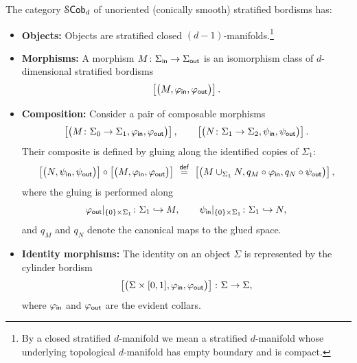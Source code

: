 \begin{definition}\label{ch5:: def: strat bord ord}
    The category $\mathcal S\mathsf{Cob}_d$ of unoriented (conically smooth) stratified bordisms has:
    \begin{itemize}
        \item \textbf{Objects:} Objects are stratified closed $(d-1)$-manifolds.\footnote{By a closed stratified $d$-manifold we mean a stratified $d$-manifold whose underlying topological $d$-manifold has empty boundary and is compact.} 
        \item \textbf{Morphisms:} A morphism $M\colon \Sigma_{\sf in} \rightarrow \Sigma_{\sf out}$ is an isomorphism class of $d$-dimensional stratified bordisms 
        \begin{equation}
            \left[\big(M, \varphi_{\sf in}, \varphi_{\sf out}\big)\right].
        \end{equation}
        \item \textbf{Composition:} Consider a pair of composable morphisms
        \begin{equation}
            \left[\big(M \colon \Sigma_0 \rightarrow \Sigma_1,\varphi_{\sf in},\varphi_{\sf out}\big)\right], \qquad \left[\big(N \colon \Sigma_1 \rightarrow \Sigma_2,\psi_{\sf in},\psi_{\sf out}\big)\right].
        \end{equation}
        Their composite is defined by gluing along the identified copies of $\Sigma_1$:
        \begin{equation}
            \left[\big(N,\psi_{\sf in},\psi_{\sf out}\big)\right]\circ \left[\big(M,\varphi_{\sf in},\varphi_{\sf out}\big)\right]
            \,\, \overset{\sf def}{=} \,\,
            \left[\big(M\cup_{\Sigma_1} N, q_M\circ \varphi_{\sf in}, q_N\circ \psi_{\sf out}\big)\right],
        \end{equation}
        where the gluing is performed along
        \begin{equation}
            \varphi_{\sf out}|_{\{0\}\times \Sigma_1}\colon \Sigma_1 \hookrightarrow M, \qquad \psi_{\sf in}|_{\{0\}\times \Sigma_1}\colon \Sigma_1 \hookrightarrow N,
        \end{equation}
        and $q_M$ and $q_N$ denote the canonical maps to the glued space.
        \item \textbf{Identity morphisms:} The identity on an object $\Sigma$ is represented by the cylinder bordism
        \begin{equation}
            \left[\big(\Sigma\times [0,1],\varphi_{\sf in},\varphi_{\sf out}\big)\right]\colon \Sigma \rightarrow \Sigma,
        \end{equation}
        where $\varphi_{\sf in}$ and $\varphi_{\sf out}$ are the evident collars.
    \end{itemize}
\end{definition}

